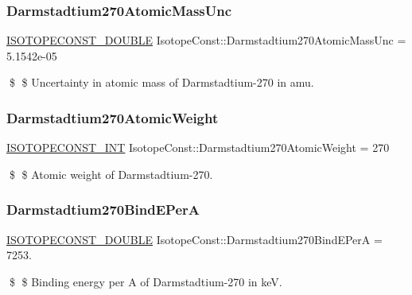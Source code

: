 \subsubsection{\texorpdfstring{Darmstadtium270\+Atomic\+Mass\+Unc}{Darmstadtium270AtomicMassUnc}}
{\footnotesize\ttfamily \mbox{\hyperlink{group___isotope_const-_macros_ga8f45a7272ce02c0b4c65c44636ed719a}{I\+S\+O\+T\+O\+P\+E\+C\+O\+N\+S\+T\+\_\+\+D\+O\+U\+B\+LE}} Isotope\+Const\+::\+Darmstadtium270\+Atomic\+Mass\+Unc = 5.\+1542e-\/05}

\$ \$ Uncertainty in atomic mass of Darmstadtium-\/270 in amu. \mbox{\label{group___isotope_const-_darmstadtium-_ds270_gaeb406de6d73370e3ecf1b20b36c41d8c}} 
\subsubsection{\texorpdfstring{Darmstadtium270\+Atomic\+Weight}{Darmstadtium270AtomicWeight}}
{\footnotesize\ttfamily \mbox{\hyperlink{group___isotope_const-_macros_ga5f18360b3e99483a35c32d789e62621c}{I\+S\+O\+T\+O\+P\+E\+C\+O\+N\+S\+T\+\_\+\+I\+NT}} Isotope\+Const\+::\+Darmstadtium270\+Atomic\+Weight = 270}

\$ \$ Atomic weight of Darmstadtium-\/270. \mbox{\label{group___isotope_const-_darmstadtium-_ds270_ga3c6fa8243953815fd022b67f8656f268}} 
\subsubsection{\texorpdfstring{Darmstadtium270\+Bind\+E\+PerA}{Darmstadtium270BindEPerA}}
{\footnotesize\ttfamily \mbox{\hyperlink{group___isotope_const-_macros_ga8f45a7272ce02c0b4c65c44636ed719a}{I\+S\+O\+T\+O\+P\+E\+C\+O\+N\+S\+T\+\_\+\+D\+O\+U\+B\+LE}} Isotope\+Const\+::\+Darmstadtium270\+Bind\+E\+PerA = 7253.}

\$ \$ Binding energy per A of Darmstadtium-\/270 in keV. \mbox{\label{group___isotope_const-_darmstadtium-_ds270_ga6a56bd2535e5cdc92b0349bc0bee4b79}} 
